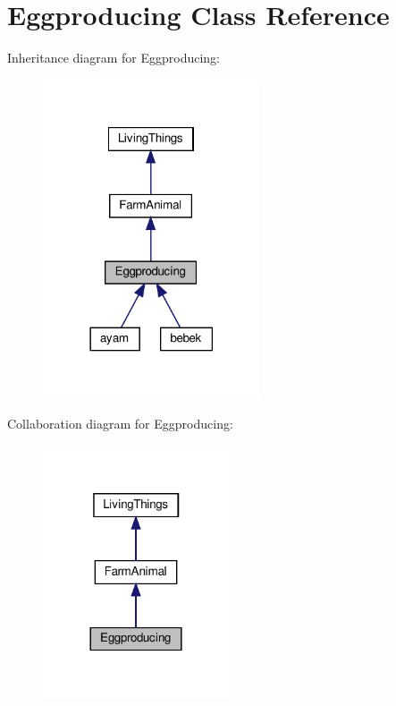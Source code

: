 \hypertarget{classEggproducing}{}\section{Eggproducing Class Reference}
\label{classEggproducing}


Inheritance diagram for Eggproducing\+:
\nopagebreak
\begin{figure}[H]
\begin{center}
\leavevmode
\includegraphics[width=182pt]{classEggproducing__inherit__graph}
\end{center}
\end{figure}


Collaboration diagram for Eggproducing\+:
\nopagebreak
\begin{figure}[H]
\begin{center}
\leavevmode
\includegraphics[width=156pt]{classEggproducing__coll__graph}
\end{center}
\end{figure}
